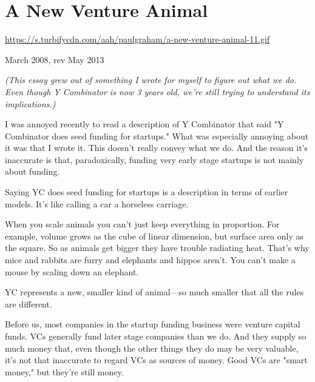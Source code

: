 \chapter{A New Venture Animal}


            
              
                \href{https://s.turbifycdn.com/aah/paulgraham/a-new-venture-animal-11.gif}{https://s.turbifycdn.com/aah/paulgraham/a-new-venture-animal-11.gif}



March 2008, rev May 2013

\emph{(This essay grew out of something I wrote for myself to
                    figure out what we do. Even though Y Combinator is now 3
                    years old, we're still trying to understand its
                    implications.)}


                  I was annoyed recently to read a description of Y Combinator
                  that said "Y Combinator does seed funding for startups." What
                  was especially annoying about it was that I wrote it. This
                  doesn't really convey what we do. And the reason it's
                  inaccurate is that, paradoxically, funding very early stage
                  startups is not mainly about funding.

Saying YC
                  does seed funding for startups is a description in terms of
                  earlier models. It's like calling a car a horseless
                  carriage.

When you scale animals you can't just
                  keep everything in proportion. For example, volume grows as
                  the cube of linear dimension, but surface area only as the
                  square. So as animals get bigger they have trouble radiating
                  heat. That's why mice and rabbits are furry and elephants and
                  hippos aren't. You can't make a mouse by scaling down an
                  elephant.

YC represents a new, smaller kind of
                  animal---so much smaller that all the rules are
                  different.

Before us, most companies in the startup
                  funding business were venture capital funds. VCs generally
                  fund later stage companies than we do. And they supply so much
                  money that, even though the other things they do may be very
                  valuable, it's not that inaccurate to regard VCs as sources of
                  money. Good VCs are "smart money," but they're still money.

